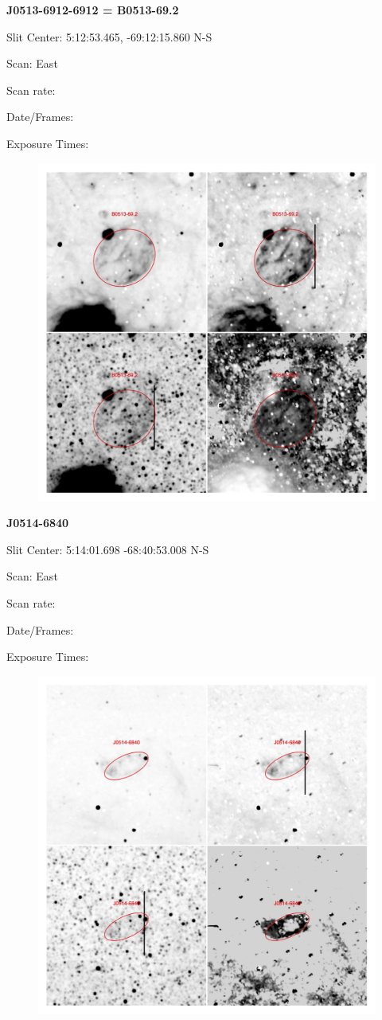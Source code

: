 \documentclass[11pt]{article}
\begin{document}
\newpage
{\bf J0513-6912-6912 = B0513-69.2}  
 
Slit Center:   5:12:53.465, -69:12:15.860    N-S 

Scan:  East

Scan rate:  

Date/Frames:

Exposure Times:  

\begin{figure}
\includegraphics[width=11.cm]{snapshots/B0513-692.png}
\end{figure}

\newpage
{\bf J0514-6840}  
 
Slit Center:   5:14:01.698 -68:40:53.008    N-S 

Scan:  East

Scan rate:  

Date/Frames:

Exposure Times:  

\begin{figure}
\includegraphics[width=11.cm]{snapshots/J0514-6840.png}
\end{figure}
\end{document}
